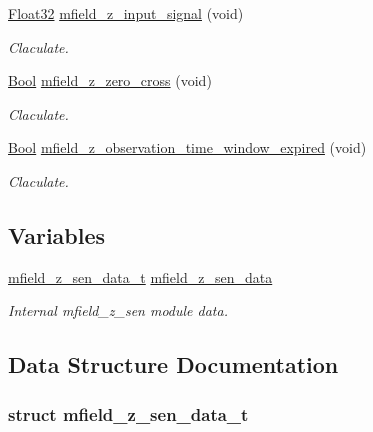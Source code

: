 \begin{DoxyCompactItemize}
\hyperlink{a00072_a87d38f886e617ced2698fc55afa07637}{Float32} \hyperlink{a00027_a30e963041fabe45400803a40cc920b85}{mfield\+\_\+z\+\_\+input\+\_\+signal} (void)
\begin{DoxyCompactList}\small\item\em Claculate. \end{DoxyCompactList}\item 
\hyperlink{a00072_a253b248072cfc8bd812c69acd0046eed}{Bool} \hyperlink{a00027_a8830f50d7a451bec0a7d61c44d5cd98b}{mfield\+\_\+z\+\_\+zero\+\_\+cross} (void)
\begin{DoxyCompactList}\small\item\em Claculate. \end{DoxyCompactList}\item 
\hyperlink{a00072_a253b248072cfc8bd812c69acd0046eed}{Bool} \hyperlink{a00027_a8d1f1b622ef0081218e8f64cd9a44e59}{mfield\+\_\+z\+\_\+observation\+\_\+time\+\_\+window\+\_\+expired} (void)
\begin{DoxyCompactList}\small\item\em Claculate. \end{DoxyCompactList}\end{DoxyCompactItemize}
\subsection*{Variables}
\begin{DoxyCompactItemize}
\item 
\hyperlink{a00027_d8/dbd/a00597}{mfield\+\_\+z\+\_\+sen\+\_\+data\+\_\+t} \hyperlink{a00027_ae42bea09c571df9fad890518725d5cf4}{mfield\+\_\+z\+\_\+sen\+\_\+data}
\begin{DoxyCompactList}\small\item\em Internal mfield\+\_\+z\+\_\+sen module data. \end{DoxyCompactList}\end{DoxyCompactItemize}


\subsection{Data Structure Documentation}
\label{d8/dbd/a00597}
\hypertarget{a00027_d8/dbd/a00597}{}
\subsubsection{struct mfield\+\_\+z\+\_\+sen\+\_\+data\+\_\+t}



